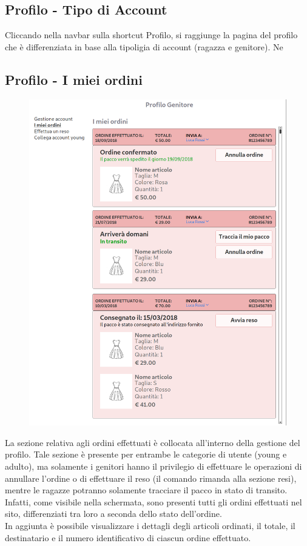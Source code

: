 \documentclass[12pt,a4paper]{report}
\begin{document}
\subsection{Profilo - Tipo di Account}
Cliccando nella navbar sulla shortcut Profilo, si raggiunge la pagina del profilo che è differenziata in base alla tipoligia di account (ragazza e genitore).
Ne
\newpage
\subsection{Profilo - I miei ordini}
\begin{figure}
\includegraphics[height=0.50\textheight]{"Images Latex/Immagini Wireframe/Desktop/16 - Profilo Ordini"}
\vspace{-5pt}
\end{figure}
La sezione relativa agli ordini effettuati è collocata all'interno della gestione del profilo. Tale sezione è presente per entrambe le categorie di utente (young e adulto), ma solamente i genitori hanno il privilegio di effettuare le operazioni di annullare l'ordine o di effettuare il reso (il comando rimanda alla sezione resi), mentre le ragazze potranno solamente tracciare il pacco in stato di transito.\\
Infatti, come visibile nella schermata, sono presenti tutti gli ordini effettuati nel sito, differenziati tra loro a seconda dello stato dell'ordine.\\ In aggiunta è possibile visualizzare i dettagli degli articoli ordinati, il totale, il destinatario e il numero identificativo di ciascun ordine effettuato.
\newpage
\end{document}
